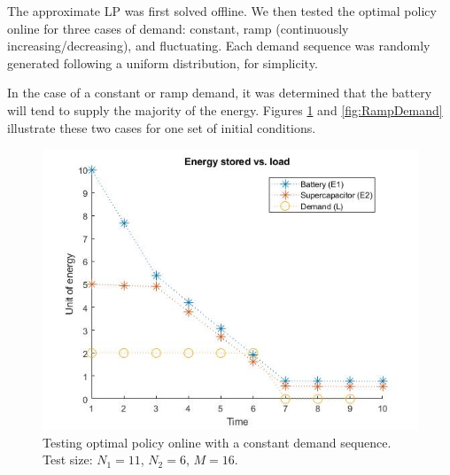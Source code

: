 \documentclass[conference]{IEEEtran}
\begin{document}
The approximate LP was first solved offline. We then tested the optimal policy online for three cases of demand: constant, ramp (continuously increasing/decreasing), and fluctuating. Each demand sequence was randomly generated following a uniform distribution, for simplicity. %

In the case of a constant or ramp demand, it was determined that the battery will tend to supply the majority of the energy. Figures \ref{fig:ConstDemand} and \ref{fig:RampDemand} illustrate these two cases for one set of initial conditions.
\begin{figure}[htbp]
\centerline{\includegraphics[scale=0.35]{EnergyStoredvsload_ConstantLoad(E1_max=10,E2_max=5).jpg}}
\caption{Testing optimal policy online with a constant demand sequence. Test size: $N_{1}=11$, $N_{2}=6$, $M=16$.}
\label{fig:ConstDemand}
\end{figure}
\end{document}
